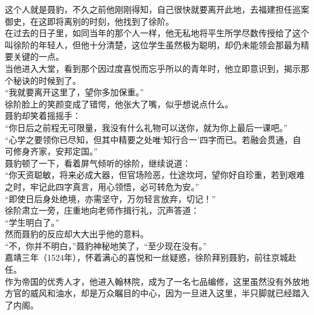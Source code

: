 \begin{multicols}{\theparacolNo}
这个人就是聂豹，不久之前他刚刚得知，自己很快就要离开此地，去福建担任巡案御史，在这即将离别的时刻，他找到了徐阶。\\

在过去的日子里，如同当年的那个人一样，他无私地将平生所学尽数传授给了这个叫徐阶的年轻人，但他十分清楚，这位学生虽然极为聪明，却仍未能领会那最为精要关键的一点。\\

当他进入大堂，看到那个因过度喜悦而忘乎所以的青年时，他立即意识到，揭示那个秘诀的时候到了。\\

“我就要离开这里了，望你多加保重。”\\

徐阶脸上的笑颜变成了错愕，他张大了嘴，似乎想说点什么。\\

聂豹却笑着摇摇手：\\

“你日后之前程无可限量，我没有什么礼物可以送你，就为你上最后一课吧。”\\

“心学之要领你已尽知，但其中精要之处唯‘知行合一’四字而已。若融会贯通，自可修身齐家，安邦定国。”\\

聂豹顿了一下，看着屏气倾听的徐阶，继续说道：\\

“你天资聪敏，将来必成大器，但官场险恶，仕途坎坷，望你好自珍重，若到艰难之时，牢记此四字真言，用心领悟，必可转危为安。”\\

“即使日后身处绝境，亦需坚守，万勿轻言放弃，切记！”\\

徐阶肃立一旁，庄重地向老师作揖行礼，沉声答道：\\

“学生明白了。”\\

然而聂豹的反应却大大出乎他的意料。\\

“不，你并不明白，”聂豹神秘地笑了，“至少现在没有。”\\

嘉靖三年（1524年），怀着满心的喜悦和一丝疑惑，徐阶拜别聂豹，前往京城赴任。\\

作为帝国的优秀人才，他进入翰林院，成为了一名七品编修，这里虽然没有外放地方官的威风和油水，却是万众瞩目的中心，因为一旦进入这里，半只脚就已经踏入了内阁。\\


\end{multicols}
